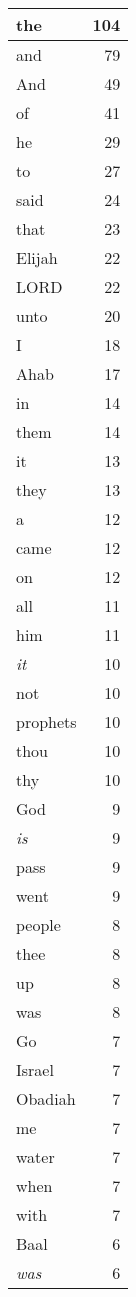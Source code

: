 \begin{center}
\begin{longtable}{l|r}
\hline \hline
\endlastfoot
the & 104 \\ \hline
and & 79 \\ \hline
And & 49 \\ \hline
of & 41 \\ \hline
he & 29 \\ \hline
to & 27 \\ \hline
said & 24 \\ \hline
that & 23 \\ \hline
Elijah & 22 \\ \hline
LORD & 22 \\ \hline
unto & 20 \\ \hline
I & 18 \\ \hline
Ahab & 17 \\ \hline
in & 14 \\ \hline
them & 14 \\ \hline
it & 13 \\ \hline
they & 13 \\ \hline
a & 12 \\ \hline
came & 12 \\ \hline
on & 12 \\ \hline
all & 11 \\ \hline
him & 11 \\ \hline
\emph{it} & 10 \\ \hline
not & 10 \\ \hline
prophets & 10 \\ \hline
thou & 10 \\ \hline
thy & 10 \\ \hline
God & 9 \\ \hline
\emph{is} & 9 \\ \hline
pass & 9 \\ \hline
went & 9 \\ \hline
people & 8 \\ \hline
thee & 8 \\ \hline
up & 8 \\ \hline
was & 8 \\ \hline
Go & 7 \\ \hline
Israel & 7 \\ \hline
Obadiah & 7 \\ \hline
me & 7 \\ \hline
water & 7 \\ \hline
when & 7 \\ \hline
with & 7 \\ \hline
Baal & 6 \\ \hline
\emph{was} & 6 \\ \hline

\end{longtable}
\end{center}
